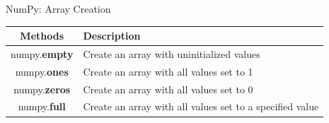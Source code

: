 \documentclass{beamer}
\begin{document}
    \begin{frame}[fragile]{NumPy: Array Creation}
        \begin{example}
            \begin{center}
                \begin{tabular}{ | c | p{6.0cm} |}
                    \hline
                    \textbf{Methods} & \textbf{Description} \\
                    \hline
                    numpy.\textbf{empty} & Create an array with uninitialized values \\
                    numpy.\textbf{ones} & Create an array with all values set to 1 \\
                    numpy.\textbf{zeros} & Create an array with all values set to 0 \\
                    numpy.\textbf{full} & Create an array with all values set to a specified value \\
                    \hline
                \end{tabular}
            \end{center}
        \end{example}
    \end{frame}
\end{document}

